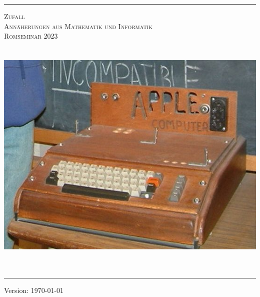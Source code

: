 \begin{titlepage}
%
\newcommand{\HRule}{\rule{\linewidth}{.25mm}}
\HRule
\vspace*{10pt}
\begin{center}
	{\scshape {\Huge Zufall} \\[0.5em]
	{\Large Annäherungen aus Mathematik und Informatik} \\[5mm]
	{\large Romseminar 2023} \\ }
	\vspace*{15pt}
	\includegraphics[width=14cm, height=12cm, keepaspectratio=true]{./content/Gruppenbild}
	\vspace*{10pt}	  
\end{center}
%
\HRule
{}
\begin{center}
	  {Version: \today }
\end{center}
\end{titlepage}
